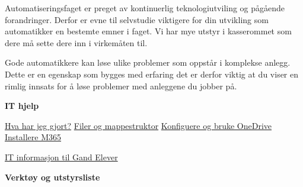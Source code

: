 \documentclass[12pt,a4paper]{article}
\begin{document}
\noindent
{} Automatiseringsfaget er preget av kontinuerlig teknologiutviling og pågående forandringer. Derfor er evne til selvstudie viktigere for din utvikling som automatikker en bestemte emner i faget. Vi har mye utstyr i kasserommet som dere må sette dere inn i virkemåten til. 

\vskip 10pt
\noindent
{} Gode automatikkere kan løse ulike problemer som oppstår i komplekse anlegg. Dette er en egenskap som bygges med erfaring det er derfor viktig at du viser en rimlig innsats for å løse problemer med anleggene du jobber på.
\vskip 10pt
\eject



\centerline{\bf IT hjelp} \bigskip 

\href{https://forms.office.com/Pages/DesignPageV2.aspx?origin=NeoPortalPage&subpage=design&id=H75sAsQBmEalZi_EPr7HMR3QcgyZmWZGpIMQU6JKCTZUM1dDVVM5WEZHU1A4N0dFRTJMSlpCRThVRi4u}{Hva har jeg gjort?}
\vskip 1cm
\href{https://rfka-my.sharepoint.com/:v:/g/personal/sverre_wilhelmsen_skole_rogfk_no/EfmqE3Pj3mNFlTp-p-owBP8Biqz8LDh1uGrZO5f0QOXu0g?e=z03gZU}{Filer og mappestruktor}
\vskip 1cm
\href{https://vimeo.com/850876389}{Konfiguere og bruke OneDrive}
\vskip 1cm
\href{https://vimeo.com/850863231}{Installere M365}

\vskip 1cm
\href{https://rfka.sharepoint.com/:b:/r/sites/GANDElevinformasjon/Delte%20dokumenter/IT/Infoskriv%20til%20%20VG1%20(2024).pdf?csf=1&web=1&e=NsSipR}{IT informasjon til Gand Elever}
\vskip 1cm
\vskip 1cm
\vskip 1cm


\vskip 1cm
\eject




\centerline{\bf Verktøy og utstyrsliste }

\vskip 10pt
\end{document}
